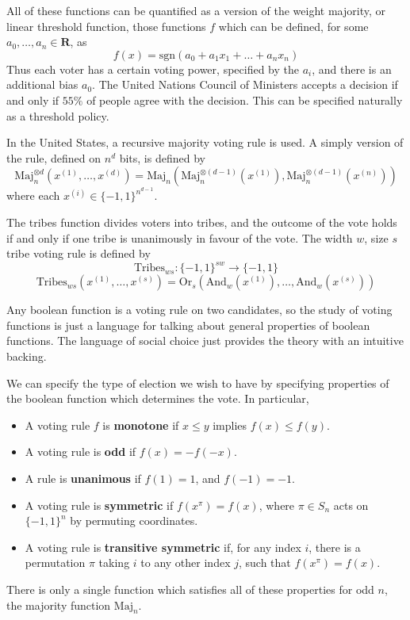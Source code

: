 \begin{example}
    All of these functions can be quantified as a version of the weight majority, or linear threshold function, those functions $f$ which can be defined, for some $a_0, \dots, a_n \in \mathbf{R}$, as
    \[ f(x) = \text{sgn}(a_0 + a_1x_1 + \dots + a_nx_n) \]
    Thus each voter has a certain voting power, specified by the $a_i$, and there is an additional bias $a_0$. The United Nations Council of Ministers accepts a decision if and only if $55\%$ of people agree with the decision. This can be specified naturally as a threshold policy.
\end{example}

\begin{example}
    In the United States, a recursive majority voting rule is used. A simply version of the rule, defined on $n^d$ bits, is defined by
    \[ \text{Maj}_n^{\otimes d}(x^{(1)}, \dots, x^{(d)}) = \text{Maj}_n(\text{Maj}^{\otimes (d-1)}_n(x^{(1)}), \text{Maj}^{\otimes (d-1)}_n(x^{(n)})) \]
    where each $x^{(i)} \in \{ -1, 1 \}^{n^{d-1}}$.
\end{example}

\begin{example}
    The tribes function divides voters into tribes, and the outcome of the vote holds if and only if one tribe is unanimously in favour of the vote. The width $w$, size $s$ tribe voting rule is defined by
    \[ \text{Tribes}_{ws}: \{ -1, 1 \}^{sw} \to \{ -1, 1 \} \]
    \[ \text{Tribes}_{ws}(x^{(1)}, \dots, x^{(s)}) = \text{Or}_s(\text{And}_w(x^{(1)}), \dots, \text{And}_w(x^{(s)})) \]
\end{example}

Any boolean function is a voting rule on two candidates, so the study of voting functions is just a language for talking about general properties of boolean functions. The language of social choice just provides the theory with an intuitive backing.

We can specify the type of election we wish to have by specifying properties of the boolean function which determines the vote. In particular,
%
\begin{itemize}
    \item A voting rule $f$ is {\bf monotone} if $x \leq y$ implies $f(x) \leq f(y)$.
    \item A voting rule is {\bf odd} if $f(x) = -f(-x)$.
    \item A rule is {\bf unanimous} if $f(1) = 1$, and $f(-1) = -1$.
    \item A voting rule is {\bf symmetric} if $f(x^\pi) = f(x)$, where $\pi \in S_n$ acts on $\{ -1, 1 \}^n$ by permuting coordinates.
    \item A voting rule is {\bf transitive symmetric} if, for any index $i$, there is a permutation $\pi$ taking $i$ to any other index $j$, such that $f(x^\pi) = f(x)$.
\end{itemize}
%
There is only a single function which satisfies all of these properties for odd $n$, the majority function $\text{Maj}_n$.

